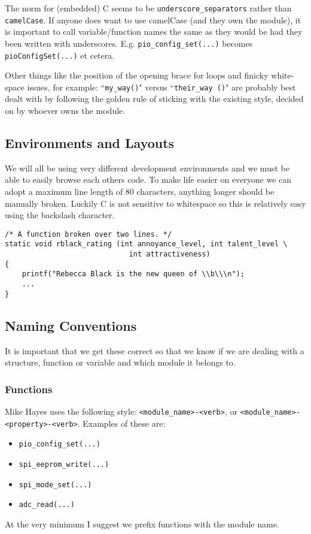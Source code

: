 \documentclass[10pt]{article}
\begin{document}
The norm for (embedded) C seems to be \texttt{underscore\_separators} rather than \texttt{camelCase}. If anyone does want to use camelCase (and they own the module), it is important to call variable/function names the same as they would be had they been written with underscores. E.g. \texttt{pio\_config\_set(...)} becomes \texttt{pioConfigSet(...)} et cetera.

Other things like the position of the opening brace for loops and finicky white-space issues, for example: ``\texttt{my\_way()}" versus ``\texttt{their\_way ()}" are probably best dealt with by following the golden rule of sticking with the existing style, decided on by whoever owns the module.

\subsection{Environments and Layouts}
We will all be using very different development environments and we must be able to easily browse each others code. To make life easier on everyone we can adopt a maximum line length of 80 characters, anything longer should be manually broken. Luckily C is not sensitive to whitespace so this is relatively easy using the backslash character.

\begin{lstlisting}[frame=single,showstringspaces=false]
/* A function broken over two lines. */
static void rblack_rating (int annoyance_level, int talent_level \
                             int attractiveness)
{
    printf("Rebecca Black is the new queen of \\b\\\n");
    ...
}
\end{lstlisting}

\subsection{Naming Conventions}
It is important that we get these correct so that we know if we are dealing with a structure, function or variable and which module it belongs to.
\subsubsection{Functions}
Mike Hayes uses the following style: \texttt{<module\_name>-<verb>}, or \texttt{<module\_name>-<property>-<verb>}. Examples of these are:
\begin{itemize}
  \item \texttt{pio\_config\_set(...)}
  \item \texttt{spi\_eeprom\_write(...)}
  \item \texttt{spi\_mode\_set(...)}
  \item \texttt{adc\_read(...)}
\end{itemize}
At the very minimum I suggest we prefix functions with the module name.
\end{document}
